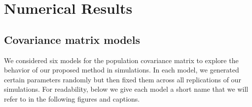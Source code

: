\documentclass[useAMS,referee,usenatbib]{biom}
\begin{document}
\section{\label{numerical results}Numerical Results}

\subsection{\label{models}Covariance matrix models}

We considered six models for the population covariance matrix to explore the behavior of our proposed method in simulations. In each model, we generated certain parameters randomly but then fixed them across all replications of our simulations. For readability, below we give each model a short name that we will refer to in the following figures and captions.
\end{document}
